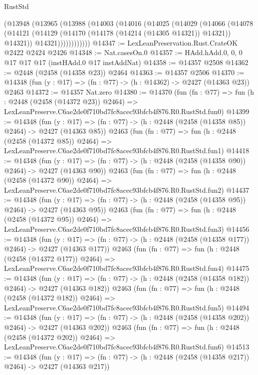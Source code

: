 \begin{lexlean}{RustStd}
\begin{coremodule}
          (@13948
            (@13965
              (@13988
                (@14003
                  (@14016
                    (@14025
                      (@14029
                        (@14066
                          (@14078
                            (@14121
                              (@14129 (@14170 (@14178 (@14214 (@14305 @14321)) @14321)) @14321))
                            @14321))))))))))))
@14347 := LexLeanPreservation.Rust.CrateOK @2422 @2424 @2426
@14348 := Nat.casesOn.{0}
@14357 := HAdd.hAdd.{0, 0, 0} @17 @17 @17 (instHAdd.{0} @17 instAddNat)
@14358 := @14357 @2508
@14362 := @2448 (@2458 (@14358 @23)) @2464
@14363 := @14357 @2506
@14370 := @14348 (fun (y : @17) => (fn : @77) -> (h : @14362) -> @2427 (@14363 @23)) @2463
@14372 := @14357 Nat.zero
@14380 := @14370
    (fun (fn : @77) =>
    fun (h : @2448 (@2458 (@14372 @23)) @2464) =>
    LexLeanPreserve.C6ae2de0f710bd7fc8acec93bfcb4f876.R0.RustStd.fun0)
@14399 := @14348
    (fun (y : @17) => (fn : @77) -> (h : @2448 (@2458 (@14358 @85)) @2464) -> @2427 (@14363 @85))
    @2463
    (fun (fn : @77) =>
    fun (h : @2448 (@2458 (@14372 @85)) @2464) =>
    LexLeanPreserve.C6ae2de0f710bd7fc8acec93bfcb4f876.R0.RustStd.fun1)
@14418 := @14348
    (fun (y : @17) => (fn : @77) -> (h : @2448 (@2458 (@14358 @90)) @2464) -> @2427 (@14363 @90))
    @2463
    (fun (fn : @77) =>
    fun (h : @2448 (@2458 (@14372 @90)) @2464) =>
    LexLeanPreserve.C6ae2de0f710bd7fc8acec93bfcb4f876.R0.RustStd.fun2)
@14437 := @14348
    (fun (y : @17) => (fn : @77) -> (h : @2448 (@2458 (@14358 @95)) @2464) -> @2427 (@14363 @95))
    @2463
    (fun (fn : @77) =>
    fun (h : @2448 (@2458 (@14372 @95)) @2464) =>
    LexLeanPreserve.C6ae2de0f710bd7fc8acec93bfcb4f876.R0.RustStd.fun3)
@14456 := @14348
    (fun (y : @17) => (fn : @77) -> (h : @2448 (@2458 (@14358 @177)) @2464) -> @2427 (@14363 @177))
    @2463
    (fun (fn : @77) =>
    fun (h : @2448 (@2458 (@14372 @177)) @2464) =>
    LexLeanPreserve.C6ae2de0f710bd7fc8acec93bfcb4f876.R0.RustStd.fun4)
@14475 := @14348
    (fun (y : @17) => (fn : @77) -> (h : @2448 (@2458 (@14358 @182)) @2464) -> @2427 (@14363 @182))
    @2463
    (fun (fn : @77) =>
    fun (h : @2448 (@2458 (@14372 @182)) @2464) =>
    LexLeanPreserve.C6ae2de0f710bd7fc8acec93bfcb4f876.R0.RustStd.fun5)
@14494 := @14348
    (fun (y : @17) => (fn : @77) -> (h : @2448 (@2458 (@14358 @202)) @2464) -> @2427 (@14363 @202))
    @2463
    (fun (fn : @77) =>
    fun (h : @2448 (@2458 (@14372 @202)) @2464) =>
    LexLeanPreserve.C6ae2de0f710bd7fc8acec93bfcb4f876.R0.RustStd.fun6)
@14513 := @14348
    (fun (y : @17) => (fn : @77) -> (h : @2448 (@2458 (@14358 @217)) @2464) -> @2427 (@14363 @217))

\end{coremodule}
\end{lexlean}
